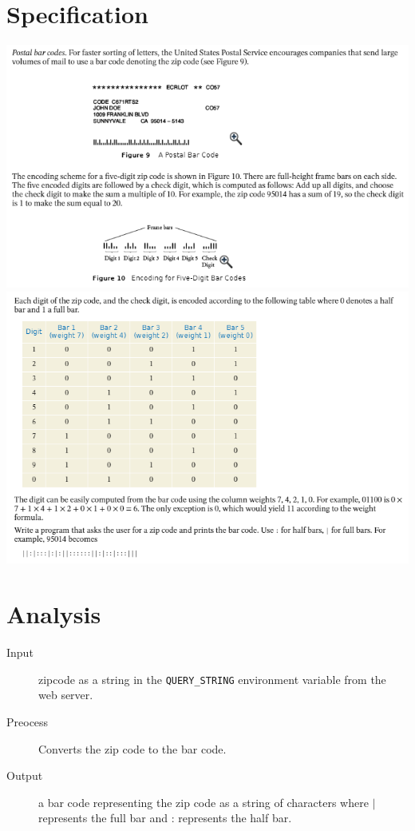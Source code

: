 \documentclass{article}
\begin{document}
\large 
\section*{Specification}
\includegraphics{postalBarCode1.png}
\newpage
\includegraphics{postalBarCode2.png}
\newpage\section*{Analysis}
\begin{description}
	\item[Input] zipcode as a string in the \verb|QUERY_STRING| environment variable from the web server.
	\item[Preocess]Converts the zip code to the bar code.
	\item[Output] a bar code representing the zip code as a string 
	              of characters where $\vert$ represents the full bar
	              and : represents the half bar.
\end{description}
\end{document}
